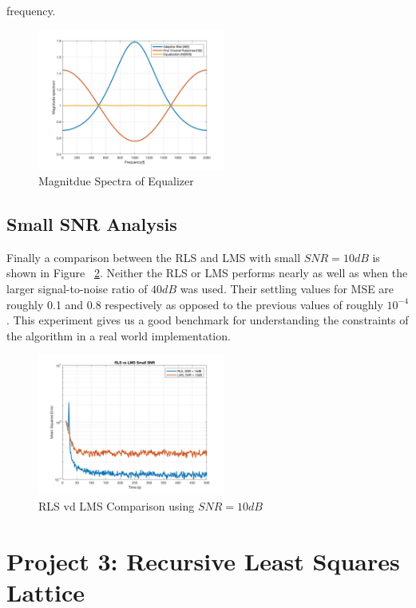 \documentclass[journal]{IEEEtran}
\begin{document}
frequency.
\begin{figure}[H]
  \centering
  \captionsetup{justification=centering,font = small}
  \includegraphics[width=0.55\textwidth, inner] {Plots/Project2_MagnitudeSpectrum.jpg}
  \caption{Magnitdue Spectra of Equalizer}
    \label{fig:magspec}
\end{figure}
\subsection{Small SNR Analysis}
Finally a comparison between the RLS and LMS with small $SNR = 10dB$ is shown in Figure ~\ref{fig:smallsnr}. Neither the RLS or LMS performs nearly as well
as when the larger signal-to-noise ratio of $40dB$ was used. Their settling values for MSE are roughly 0.1 and 0.8 respectively as opposed to the previous values of roughly $10^{-4}$.
This experiment gives us a good benchmark for understanding the constraints of the algorithm in a real world implementation. 
\begin{figure}[H]
  \centering
  \captionsetup{justification=centering,font = small}
  \includegraphics[width=0.55\textwidth, inner] {Plots/Project2_smallSNR.jpg}
  \caption{RLS vd LMS Comparison using $SNR = 10dB$}
    \label{fig:smallsnr}
\end{figure}
\section{Project 3: Recursive Least Squares Lattice}
\end{document}
